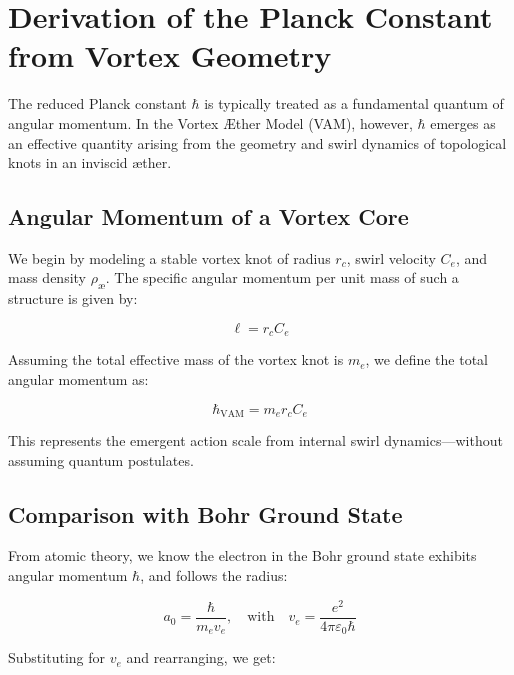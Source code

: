 
\section{Derivation of the Planck Constant from Vortex Geometry}
\label{appendix:hbar}

The reduced Planck constant \( \hbar \) is typically treated as a fundamental quantum of angular momentum. In the Vortex Æther Model (VAM), however, \( \hbar \) emerges as an effective quantity arising from the geometry and swirl dynamics of topological knots in an inviscid æther.

\subsection*{Angular Momentum of a Vortex Core}

We begin by modeling a stable vortex knot of radius \( r_c \), swirl velocity \( C_e \), and mass density \( \rho_\text{\ae} \). The specific angular momentum per unit mass of such a structure is given by:

\begin{equation}
    \ell = r_c C_e
\end{equation}

Assuming the total effective mass of the vortex knot is \( m_e \), we define the total angular momentum as:

\begin{equation}
    \hbar_{\text{VAM}} = m_e r_c C_e
\end{equation}

This represents the emergent action scale from internal swirl dynamics—without assuming quantum postulates.

\subsection*{Comparison with Bohr Ground State}

From atomic theory, we know the electron in the Bohr ground state exhibits angular momentum \( \hbar \), and follows the radius:

\begin{equation}
    a_0 = \frac{\hbar}{m_e v_e}, \quad \text{with} \quad v_e = \frac{e^2}{4\pi \varepsilon_0 \hbar}
\end{equation}

Substituting for \( v_e \) and rearranging, we get:

